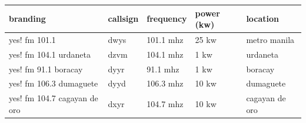 \documentclass{article}
\begin{document}
\begin{tabular}{lllll}
\toprule
branding & callsign & frequency & power (kw) & location \\
\midrule
yes! fm 101.1 & dwys & 101.1 mhz & 25 kw & metro manila \\
yes! fm 104.1 urdaneta & dzvm & 104.1 mhz & 1 kw & urdaneta \\
yes! fm 91.1 boracay & dyyr & 91.1 mhz & 1 kw & boracay \\
yes! fm 106.3 dumaguete & dyyd & 106.3 mhz & 10 kw & dumaguete \\
yes! fm 104.7 cagayan de oro & dxyr & 104.7 mhz & 10 kw & cagayan de oro \\
\bottomrule
\end{tabular}
\end{document}
